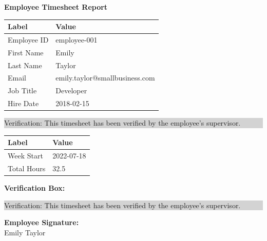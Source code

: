 \documentclass{article}
\begin{document}
\begin{center}
{\Large \textbf{Employee Timesheet Report}}
\vspace{-0.5cm}
\end{center}

\noindent
\begin{tabularx}{\textwidth}{|l|X|}
\hline
\textbf{Label} & \textbf{Value} \\
\hline
Employee ID & employee-001 \\
First Name & Emily \\
Last Name & Taylor \\
Email & emily.taylor@smallbusiness.com \\
Job Title & Developer \\
Hire Date & 2018-02-15 \\
\hline
\end{tabularx}

\vspace{1cm}

\noindent
{\colorbox{lightgray}{%
\begin{minipage}[t]{0.4\textwidth}
\raggedright
Verification: This timesheet has been verified by the employee's supervisor.
\end{minipage}%
}}

\vspace{1cm}

\noindent
\begin{tabularx}{\textwidth}{|l|X|}
\hline
\textbf{Label} & \textbf{Value} \\
\hline
Week Start & 2022-07-18 \\
Total Hours & 32.5 \\
\hline
\end{tabularx}

\vspace{1cm}

\noindent
{\Large \textbf{Verification Box:}}
\vspace{-0.5cm}
{\colorbox{lightgray}{%
\begin{minipage}[t]{0.4\textwidth}
\raggedright
Verification: This timesheet has been verified by the employee's supervisor.
\end{minipage}%
}}

\vfill

\noindent
{\Large \textbf{Employee Signature:}} \\
Emily Taylor \\
\vspace{-1cm}
\end{document}
